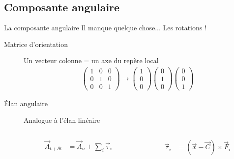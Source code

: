 \documentclass{beamer}
\newcommand{\deriv}{\partial \!}
\begin{document}
\subsection{Composante angulaire}

\begin{frame}{La composante angulaire}
  Il manque quelque chose... Les rotations !

  \begin{description}
  \item[Matrice d'orientation]
    Un vecteur colonne = un axe du repère local
    \begin{align*}
      \begin{pmatrix}
        1 & 0 & 0 \\ 0 & 1 & 0 \\ 0 & 0 & 1
      \end{pmatrix}
      \rightarrow
      \begin{pmatrix}
        1 \\ 0 \\ 0
      \end{pmatrix}
      \begin{pmatrix}
        0 \\ 1 \\ 0
      \end{pmatrix}
      \begin{pmatrix}
        0 \\ 0 \\ 1
      \end{pmatrix}
    \end{align*}
    
    \vfill

  \item[\'Elan angulaire]
    Analogue à l'élan linéaire
    \begin{columns}
      \begin{column}{3cm}
        \begin{align*}
          \vec{A}_{t + \deriv t} &= \vec{A}_n + {\sum_i \vec{\tau}_i}
        \end{align*}
      \end{column}
      \begin{column}{3cm}
        \begin{align*}
          \vec{\tau}_i &= (\vec{x} - \vec{C}) \times \vec{F}_i
        \end{align*}
      \end{column}
    \end{columns}
  \end{description}
\end{frame}
\end{document}
